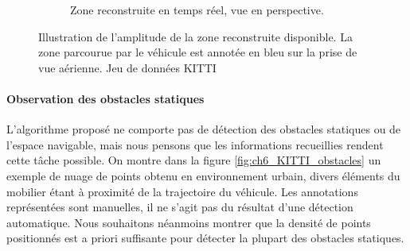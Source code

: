 \begin{figure}
{\begin{subfigure}{0.6\textwidth}
			\caption{Zone reconstruite en temps réel, vue en perspective.}
		\end{subfigure}	
	}
	\caption{Illustration de l'amplitude de la zone reconstruite disponible. La zone parcourue par le véhicule est annotée en bleu sur la prise de vue aérienne. Jeu de données \og KITTI\fg{} \cite{Geiger2012}}
	\label{fig:ch6_KITTI_span}
\end{figure}

\paragraph{Observation des obstacles statiques}
L'algorithme proposé ne comporte pas de détection des obstacles statiques ou de l'espace navigable, mais nous pensons que les informations recueillies rendent cette tâche possible. On montre dans la figure \ref{fig:ch6_KITTI_obstacles} un exemple de nuage de points obtenu en environnement urbain, divers éléments du mobilier étant à proximité de la trajectoire du véhicule. Les annotations représentées sont manuelles, il ne s'agit pas du résultat d'une détection automatique. Nous souhaitons néanmoins montrer que la densité de points positionnés est a priori suffisante pour détecter la plupart des obstacles statiques.

